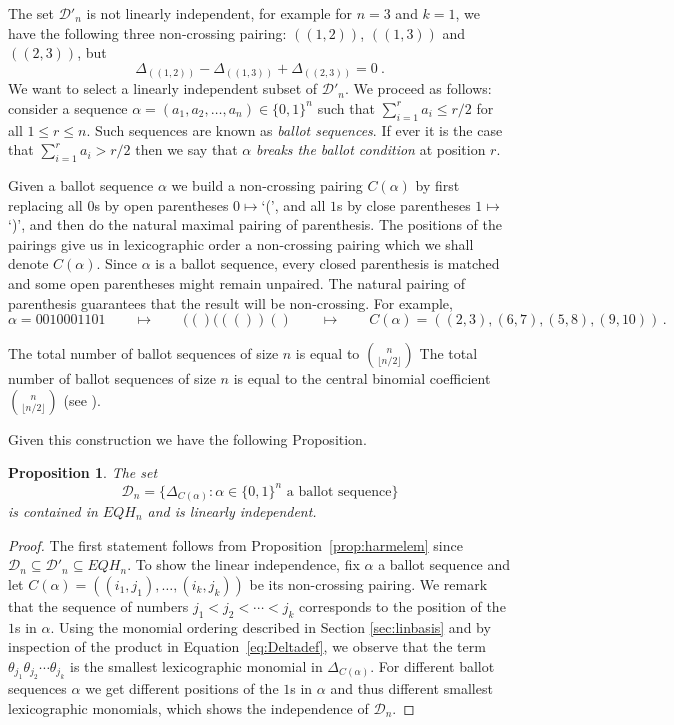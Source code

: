 \documentclass[submission]{FPSAC2023}
\newcommand{\defncolor}{\color{darkred}}
\newcommand{\defn}[1]{{\defncolor\emph{#1}}} %
\newtheorem{prop}[theorem]{Proposition}
\theoremstyle{definition}
\numberwithin{equation}{section}
\begin{document}
The set ${\mathcal D}'_n$ is not linearly independent, for example for $n=3$ and $k=1$, we have the following three non-crossing pairing:
$((1,2))$, $((1,3))$ and $((2,3))$, but
\[
\Delta_{((1,2))} - \Delta_{((1,3))} + \Delta_{((2,3))} =0 ~.
\]
We want to select a linearly independent subset of ${\mathcal D}'_n$. We proceed as follows:
consider a sequence
$\alpha = (a_1, a_2, \ldots, a_n) \in \{0, 1\}^n$
such that $\sum_{i=1}^r a_i \leq r/2$ for all $1 \leq r \leq n$.
Such sequences are known as \defn{ballot sequences}.
If ever it is the case that $\sum_{i=1}^r a_i > r/2$ then we say that
$\alpha$ \defn{breaks the ballot condition} at position $r$.

Given a ballot sequence $\alpha$ we build a non-crossing pairing $C(\alpha)$ by first replacing all $0$s
by open parentheses $0\mapsto$`(',
and all $1$s by close parentheses $1\mapsto$`)',
and then do the natural maximal pairing of parenthesis. The positions of the pairings
give us in lexicographic order a non-crossing pairing which we shall denote $C(\alpha)$.
Since $\alpha$ is a ballot sequence, every closed parenthesis is matched
and some open parentheses might remain unpaired.
The natural pairing of parenthesis guarantees that the result will be non-crossing. For example,
\[
\alpha=0010001101 \qquad\mapsto\qquad (()((())() \qquad\mapsto\qquad C(\alpha)=((2,3),(6,7),(5,8),(9,10)) \,.
\]

The total number of ballot sequences of size $n$ is equal to $\binom{n}{\lfloor{n/2}\rfloor}$
The total number of ballot sequences of size $n$ is equal to the central binomial coefficient $\binom{n}{\lfloor{n/2}\rfloor}$
(see \cite[\href{https://oeis.org/A001405}{A001405}]{OEIS}).

Given this construction we have the following Proposition.

\begin{prop}\label{prop:harmbasis}
The set
$${\mathcal D}_n =\big\{ \Delta_{C(\alpha)}:  \alpha \in \{0, 1\}^n \text{ a ballot sequence}\big\}
$$
is contained in $EQH_n$ and is linearly independent.
\end{prop}

\begin{proof}
  The first statement follows from Proposition~\ref{prop:harmelem} since ${\mathcal D}_n \subseteq {\mathcal D}'_n \subseteq EQH_n$.
To show the linear independence, fix $\alpha$ a ballot sequence and let $C(\alpha)=((i_1,j_1),\ldots,(i_k,j_k))$ be its non-crossing pairing.  We remark that the sequence of numbers
$j_1<j_2<\cdots<j_k$ corresponds to the position of the $1$s in $\alpha$.
Using the monomial ordering described in Section \ref{sec:linbasis}
and by inspection of the product in Equation~\eqref{eq:Deltadef},
we observe that the term $\theta_{j_1}\theta_{j_2}\cdots\theta_{j_k}$ is the smallest lexicographic
monomial in $\Delta_{C(\alpha)}$.
For different ballot sequences $\alpha$ we get different positions of the $1$s in
$\alpha$ and thus different smallest lexicographic monomials,
which shows the independence of ${\mathcal D}_n$.
\end{proof}
\end{document}
